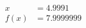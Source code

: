 \documentclass[preview]{standalone}
\begin{document}
\begin{align*}
x &= 4.9991\\f(x) &= 7.9999999
\end{align*}
\end{document}
